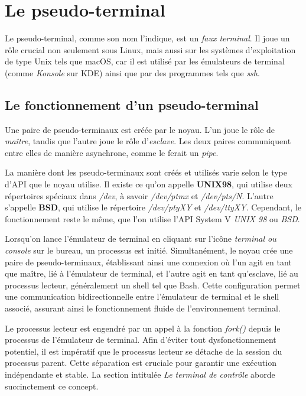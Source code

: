 \chapter{Le pseudo-terminal}
Le pseudo-terminal, comme son nom l'indique, est un \textit{faux terminal}. Il joue un rôle crucial non seulement sous Linux, mais aussi sur les systèmes d'exploitation de type Unix tels que macOS, car il est utilisé par les émulateurs de terminal (comme \textit{Konsole} sur KDE) ainsi que par des programmes tels que \textit{ssh}.

\section{Le fonctionnement d'un pseudo-terminal}
Une paire de pseudo-terminaux est créée par le noyau. L'un joue le rôle de \textit{maître}, tandis que l'autre joue le rôle d'\textit{esclave}. Les deux paires communiquent entre elles de manière asynchrone, comme le ferait un \textit{pipe}. 

\begin{tcolorbox}[title=SystemV UNIX98 ou BSD]
La manière dont les pseudo-terminaux sont créés et utilisés varie selon le type d'API que le noyau utilise. Il existe ce qu'on appelle \textbf{UNIX98}, qui utilise deux répertoires spéciaux dans \textit{/dev}, à savoir \textit{/dev/ptmx} et \textit{/dev/pts/N}. L'autre s'appelle \textbf{BSD}, qui utilise le répertoire \textit{/dev/ptyXY} et \textit{/dev/ttyXY}. Cependant, le fonctionnement reste le même, que l'on utilise l'API System V \textit{UNIX 98} ou \textit{BSD}.
\end{tcolorbox}

Lorsqu'on lance l'émulateur de terminal en cliquant sur l'icône \textit{terminal ou console} sur le bureau, un processus est initié. Simultanément, le noyau crée une paire de pseudo-terminaux, établissant ainsi une connexion où l'un agit en tant que maître, lié à l'émulateur de terminal, et l'autre agit en tant qu'esclave, lié au processus lecteur, généralement un shell tel que Bash. Cette configuration permet une communication bidirectionnelle entre l'émulateur de terminal et le shell associé, assurant ainsi le fonctionnement fluide de l'environnement terminal.

Le processus lecteur est engendré par un appel à la fonction \textit{fork()} depuis le processus de l'émulateur de terminal. Afin d'éviter tout dysfonctionnement potentiel, il est impératif que le processus lecteur se détache de la session du processus parent. Cette séparation est cruciale pour garantir une exécution indépendante et stable. La section intitulée \textit{Le terminal de contrôle} aborde succinctement ce concept.

